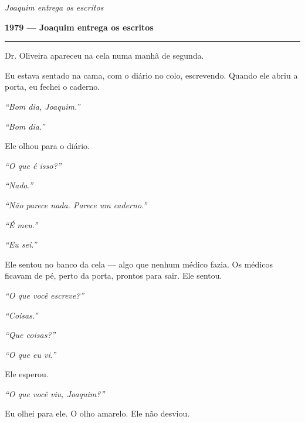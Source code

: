 
\noindent \textit{Joaquim entrega os escritos}

\noindent \textbf{1979 --- Joaquim entrega os escritos}

\vspace{0.5em}\noindent\rule{\textwidth}{0.5pt}\vspace{0.5em}

\noindent Dr. Oliveira apareceu na cela numa manhã de segunda.

\noindent Eu estava sentado na cama, com o diário no colo, escrevendo. Quando ele abriu a porta, eu fechei o caderno.

\noindent \textit{\textquotedblleft{}Bom dia, Joaquim.\textquotedblright{}}

\noindent \textit{\textquotedblleft{}Bom dia.\textquotedblright{}}

\noindent Ele olhou para o diário.

\noindent \textit{\textquotedblleft{}O que é isso?\textquotedblright{}}

\noindent \textit{\textquotedblleft{}Nada.\textquotedblright{}}

\noindent \textit{\textquotedblleft{}Não parece nada. Parece um caderno.\textquotedblright{}}

\noindent \textit{\textquotedblleft{}É meu.\textquotedblright{}}

\noindent \textit{\textquotedblleft{}Eu sei.\textquotedblright{}}

\noindent Ele sentou no banco da cela --- algo que nenhum médico fazia. Os médicos ficavam de pé, perto da porta, prontos para sair. Ele sentou.

\noindent \textit{\textquotedblleft{}O que você escreve?\textquotedblright{}}

\noindent \textit{\textquotedblleft{}Coisas.\textquotedblright{}}

\noindent \textit{\textquotedblleft{}Que coisas?\textquotedblright{}}

\noindent \textit{\textquotedblleft{}O que eu vi.\textquotedblright{}}

\noindent Ele esperou.

\noindent \textit{\textquotedblleft{}O que você viu, Joaquim?\textquotedblright{}}

\noindent Eu olhei para ele. O olho amarelo. Ele não desviou.

